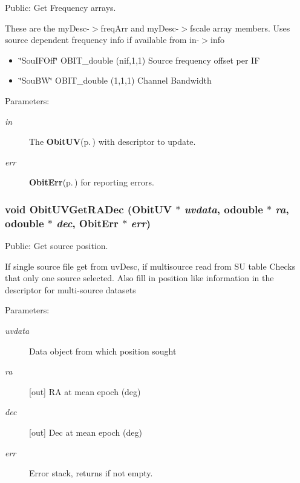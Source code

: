 Public: Get Frequency arrays. 

These are the my\-Desc-$>$freq\-Arr and my\-Desc-$>$fscale array members. Uses source dependent frequency info if available from in-$>$info \begin{itemize}
\item \char`\"{}Sou\-IFOff\char`\"{} OBIT\_\-double (nif,1,1) Source frequency offset per IF \item \char`\"{}Sou\-BW\char`\"{} OBIT\_\-double (1,1,1) Channel Bandwidth\end{itemize}
\begin{Desc}
\item[Parameters:]
\begin{description}
\item[{\em in}]The {\bf Obit\-UV}{\rm (p.\,\pageref{structObitUV})} with descriptor to update. \item[{\em err}]{\bf Obit\-Err}{\rm (p.\,\pageref{structObitErr})} for reporting errors. \end{description}
\end{Desc}
\subsubsection{\setlength{\rightskip}{0pt plus 5cm}void Obit\-UVGet\-RADec ({\bf Obit\-UV} $\ast$ {\em uvdata}, {\bf odouble} $\ast$ {\em ra}, {\bf odouble} $\ast$ {\em dec}, {\bf Obit\-Err} $\ast$ {\em err})}\label{ObitUV_8h_a51}


Public: Get source position. 

If single source file get from uv\-Desc, if multisource read from SU table Checks that only one source selected. Also fill in position like information in the descriptor for multi-source datasets \begin{Desc}
\item[Parameters:]
\begin{description}
\item[{\em uvdata}]Data object from which position sought \item[{\em ra}][out] RA at mean epoch (deg) \item[{\em dec}][out] Dec at mean epoch (deg) \item[{\em err}]Error stack, returns if not empty. \end{description}
\end{Desc}
